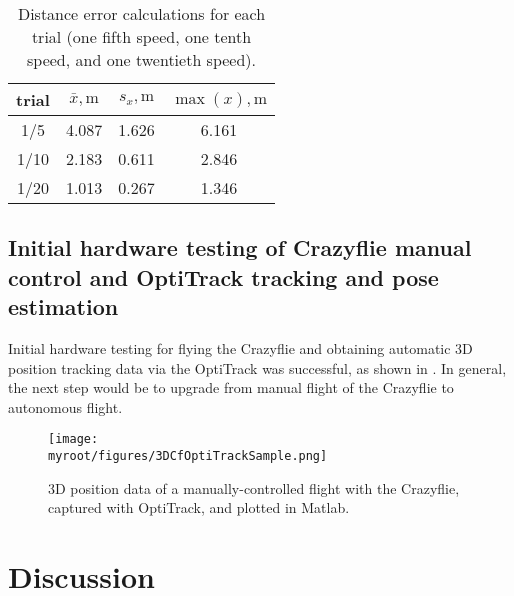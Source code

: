 \documentclass[onecolumn,10pt]{IEEEtran}
\newcommand{\myroot}{../}
\newcommand{\MATLAB}{Matlab}
\begin{document}
\begin{table}[hb]
\caption{Distance error calculations for each trial (one fifth speed, one tenth speed, and one twentieth speed).}
\label{tab:RMSE}
\begin{center}
\begin{tabular}{cccc}
\toprule
trial & $\bar{x}, \si{\meter}$ & $s_x, \si{\meter}$ & $\max(x), \si{\meter}$  \\
\midrule
1/5 & 4.087 & 1.626 & 6.161 \\
1/10 & 2.183 & 0.611 & 2.846 \\
1/20 & 1.013 & 0.267 & 1.346 \\
\bottomrule
\end{tabular}
\end{center}
\end{table}

\subsection{Initial hardware testing of Crazyflie manual control and OptiTrack tracking and pose estimation}
Initial hardware testing for flying the Crazyflie and obtaining automatic 3D position tracking data via the OptiTrack was successful, as shown in . In general, the next step would be to upgrade from manual flight of the Crazyflie to autonomous flight.
\begin{figure}
\begin{center}
\texttt{[image: \\myroot/figures/3DCfOptiTrackSample.png]}
\end{center}
\caption{3D  position data  of a manually-controlled flight with the Crazyflie, captured with OptiTrack, and plotted in \MATLAB.}
\label{fig:manualFlight}
\end{figure}
	







\clearpage
\section{Discussion}
\end{document}

